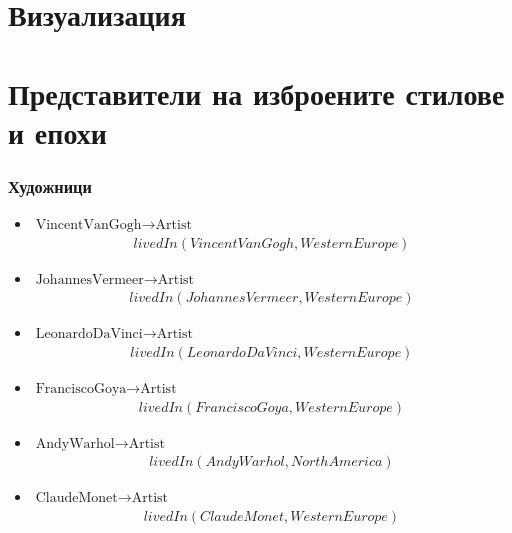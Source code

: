 \documentclass{article}
\begin{document}
\section*{Визуализация}
\begin{figure}[H]
  \centering
  
\end{figure}
\section*{Представители на изброените стилове и епохи}
\subsubsection*{Художници}
\begin{itemize}
  \item $\text{VincentVanGogh} \to \text{Artist}$
    \begin{align*}
      livedIn(VincentVanGogh, WesternEurope)
    \end{align*}
  \item $\text{JohannesVermeer} \to \text{Artist}$
    \begin{align*}
      livedIn(JohannesVermeer, WesternEurope)
    \end{align*}
  \item $\text{LeonardoDaVinci} \to \text{Artist}$
    \begin{align*}
      livedIn(LeonardoDaVinci, WesternEurope)
    \end{align*}
  \item $\text{FranciscoGoya} \to \text{Artist}$
    \begin{align*}
      livedIn(FranciscoGoya, WesternEurope)
    \end{align*}
  \item $\text{AndyWarhol} \to \text{Artist}$
    \begin{align*}
      livedIn(AndyWarhol, NorthAmerica)
    \end{align*}
  \item $\text{ClaudeMonet} \to \text{Artist}$
    \begin{align*}
      livedIn(ClaudeMonet, WesternEurope)
    \end{align*}
\end{itemize}
\end{document}
